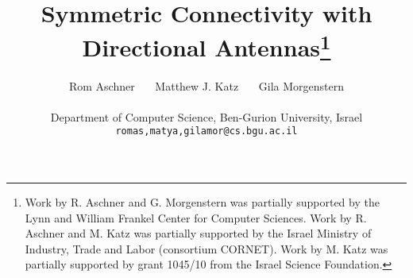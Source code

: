 \documentclass[11pt,letter]{article}
\newcommand{\old}[1]{{{}}}
\begin{document}
\title{Symmetric Connectivity with Directional Antennas\thanks{Work by R. Aschner and G. Morgenstern was partially supported by the Lynn and William Frankel Center for Computer Sciences. Work by R. Aschner and M. Katz was partially supported by the Israel Ministry of Industry, Trade and Labor (consortium CORNET). Work by M. Katz was partially supported by grant 1045/10 from the Israel Science Foundation.
}}

\author{Rom Aschner \ \ \ Matthew J. Katz \ \ \ Gila Morgenstern
\\
\\
{\small Department of Computer Science, Ben-Gurion University, Israel} \\
{\small {\tt romas,matya,gilamor@cs.bgu.ac.il}}}


\old{
\author{Rom Aschner\thanks{Partially supported by the Lynn and William Frankel Center for Computer Sciences, and by the Israel Ministry of Industry, Trade and Labor (consortium CORNET).} \ \ \ Matthew J. Katz\thanks{Partially supported by grant 1045/10 from the Israel Science Foundation, and by the Israel Ministry of Industry, Trade and Labor (consortium CORNET).} \ \ \ Gila Morgenstern\thanks{Partially supported by the Lynn and William Frankel Center for Computer Sciences.}
\\
{\small Department of Computer Science, Ben-Gurion University, Israel} \\
{\small {\tt romas,matya,gilamor@cs.bgu.ac.il}}}
}
\old{
\author{Rom Aschner\thanks{Dept. of Computer Science, Ben-Gurion University, Beer-Sheva 84105, Israel, {\tt romas@cs.bgu.ac.il}. Partially supported by the Lynn and William Frankel Center for Computer Sciences, and by the Israel Ministry of Industry, Trade and Labor (consortium CORNET).} \and Matthew J. Katz\thanks{Dept. of Computer Science, Ben-Gurion University, Beer-Sheva 84105, Israel, {\tt matya@cs.bgu.ac.il}. Partially supported by grant 1045/10 from the Israel Science Foundation, and by the Israel Ministry of Industry, Trade and Labor (consortium CORNET).} \and Gila Morgenstern\thanks{Dept. of Computer Science, Ben-Gurion University, Beer-Sheva 84105, Israel, {\tt gilamor@cs.bgu.ac.il}. Partially supported by the Lynn and William Frankel Center for Computer Sciences.}}
}


\maketitle
\end{document}
